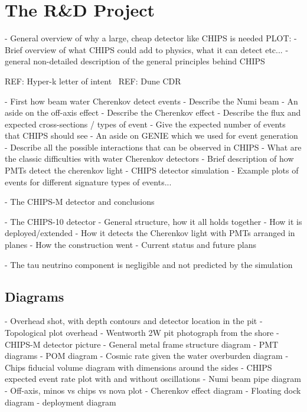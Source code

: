 \chapter{The \chips R\&D Project}
\label{chap:chips}



- General overview of why a large, cheap detector like CHIPS is needed
PLOT: 
- Brief overview of what CHIPS could add to physics, what it can detect etc...
- general non-detailed description of the general principles behind CHIPS

REF: Hyper-k letter of intent~\cite{abe2011}
REF: Dune CDR~\cite{acciarri2016}

- First how beam water Cherenkov detect events
- Describe the Numi beam
- An aside on the off-axis effect
- Describe the Cherenkov effect
- Describe the flux and expected cross-sections / types of event
- Give the expected number of events that CHIPS should see
- An aside on GENIE which we used for event generation
- Describe all the possible interactions that can be observed in CHIPS
- What are the classic difficulties with water Cherenkov detectors
- Brief description of how PMTs detect the cherenkov light
- CHIPS detector simulation
- Example plots of events for different signature types of events...

- The CHIPS-M detector and conclusions

- The CHIPS-10 detector
- General structure, how it all holds together
- How it is deployed/extended
- How it detects the Cherenkov light with PMTs arranged in planes
- How the construction went
- Current status and future plans

- The tau neutrino component is negligible and not predicted by the simulation


\section{Diagrams}




- Overhead shot, with depth contours and detector location in the pit
- Topological plot overhead
- Wentworth 2W pit photograph from the shore
- CHIPS-M detector picture
- General metal frame structure diagram
- PMT diagrams
- POM diagram
- Cosmic rate given the water overburden diagram
- Chips fiducial volume diagram with dimensions around the sides
- CHIPS expected event rate plot with and without oscillations
- Numi beam pipe diagram
- Off-axis, minos vs chips vs nova plot
- Cherenkov effect diagram
- Floating dock diagram
- deployment diagram


